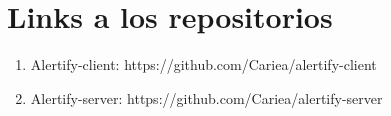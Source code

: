 \section*{Links a los repositorios}

\begin{enumerate}
  \item Alertify-client: https://github.com/Cariea/alertify-client
  \item Alertify-server: https://github.com/Cariea/alertify-server
\end{enumerate}
